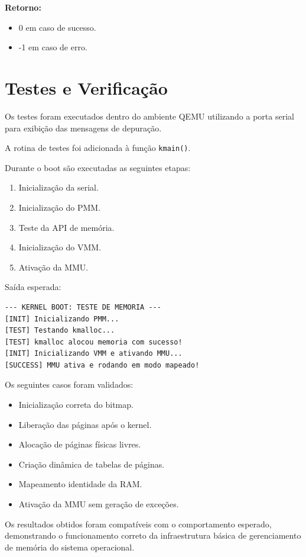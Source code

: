 \textbf{Retorno:}
\begin{itemize}
\item 0 em caso de sucesso.
\item -1 em caso de erro.
\end{itemize}


\section{Testes e Verificação}
%
%

Os testes foram executados dentro do ambiente QEMU utilizando a porta serial para exibição das mensagens de depuração.

A rotina de testes foi adicionada à função \texttt{kmain()}.

Durante o boot são executadas as seguintes etapas:

\begin{enumerate}
\item Inicialização da serial.
\item Inicialização do PMM.
\item Teste da API de memória.
\item Inicialização do VMM.
\item Ativação da MMU.
\end{enumerate}

Saída esperada:

\begin{verbatim}
--- KERNEL BOOT: TESTE DE MEMORIA ---
[INIT] Inicializando PMM...
[TEST] Testando kmalloc...
[TEST] kmalloc alocou memoria com sucesso!
[INIT] Inicializando VMM e ativando MMU...
[SUCCESS] MMU ativa e rodando em modo mapeado!
\end{verbatim}

Os seguintes casos foram validados:

\begin{itemize}
\item Inicialização correta do bitmap.
\item Liberação das páginas após o kernel.
\item Alocação de páginas físicas livres.
\item Criação dinâmica de tabelas de páginas.
\item Mapeamento identidade da RAM.
\item Ativação da MMU sem geração de exceções.
\end{itemize}

Os resultados obtidos foram compatíveis com o comportamento esperado, demonstrando o funcionamento correto da infraestrutura básica de gerenciamento de memória do sistema operacional.